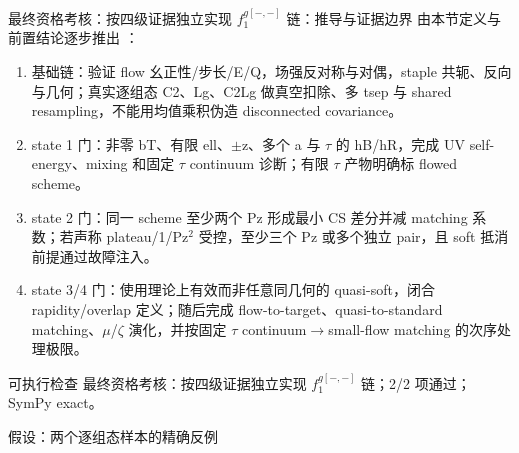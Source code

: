\begin{frame}[t]{最终资格考核：按四级证据独立实现 \ensuremath{f_1^{g[-,-]}} 链：推导与证据边界}
\footnotesize
{}\quad 由本节定义与前置结论逐步推出 ：
\begin{enumerate}
\item 基础链：验证 flow 幺正性/\allowbreak{}步长/\allowbreak{}E/\allowbreak{}Q，场强反对称与对偶，staple 共轭、反向与几何；真实逐组态 C2、Lg、C2Lg 做真空扣除、多 tsep 与 shared resampling，不能用均值乘积伪造 disconnected covariance。
\item state 1 门：非零 bT、有限 ell、\ensuremath{\pm}z、多个 a 与 \ensuremath{\tau} 的 hB/\allowbreak{}hR，完成 UV self-energy、mixing 和固定 \ensuremath{\tau} continuum 诊断；有限 \ensuremath{\tau} 产物明确标 flowed scheme。
\item state 2 门：同一 scheme 至少两个 Pz 形成最小 CS 差分并减 matching 系数；若声称 plateau/\allowbreak{}1/\allowbreak{}Pz\ensuremath{^{2}} 受控，至少三个 Pz 或多个独立 pair，且 soft 抵消前提通过故障注入。
\item state 3/\allowbreak{}4 门：使用理论上有效而非任意同几何的 quasi-soft，闭合 rapidity/\allowbreak{}overlap 定义；随后完成 flow-to-target、quasi-to-standard matching、\ensuremath{\mu}/\allowbreak{}\ensuremath{\zeta} 演化，并按固定 \ensuremath{\tau} continuum\ensuremath{\rightarrow}small-flow matching 的次序处理极限。
\end{enumerate}\begin{block}{可执行检查}
\quad 最终资格考核：按四级证据独立实现 \ensuremath{f_1^{g[-,-]}} 链；2/2 项通过；SymPy exact。
\par\scriptsize 假设：两个逐组态样本的精确反例
\end{block}
\end{frame}

